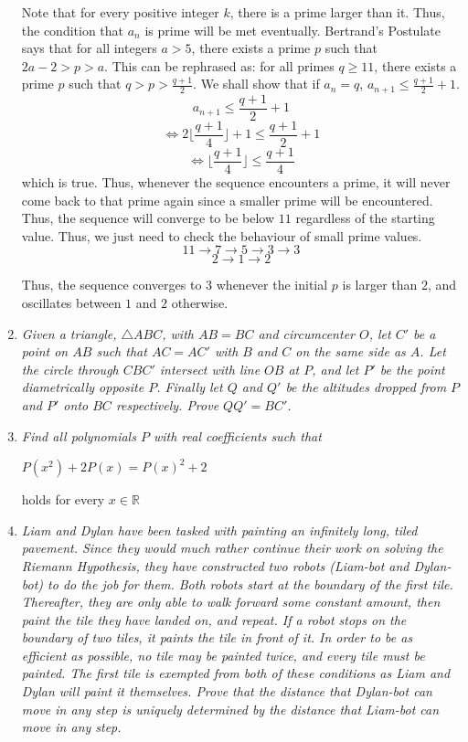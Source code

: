 \documentclass{article}
\begin{document}
\begin{enumerate}
Note that for every positive integer $k$, there is a prime larger than it. Thus, the condition that $a_n$ is prime will be met eventually. Bertrand's Postulate says that for all integers $a > 5$, there exists a prime $p$ such that $2a - 2 > p > a$. This can be rephrased as: for all primes $q \ge 11$, there exists a prime $p$ such that $q > p > \frac{q + 1}{2}$. We shall show that if $a_n = q$, $a_{n + 1} \le \frac{q + 1}{2} + 1$.
$$a_{n + 1} \le \frac{q + 1}{2} + 1$$
$$\iff 2\lfloor \frac{q + 1}{4}\rfloor + 1 \le \frac{q + 1}{2} + 1$$
$$\iff \lfloor \frac{q + 1}{4} \rfloor \le \frac{q + 1}{4}$$
which is true. Thus, whenever the sequence encounters a prime, it will never come back to that prime again since a smaller prime will be encountered. Thus, the sequence will converge to be below $11$ regardless of the starting value. Thus, we just need to check the behaviour of small prime values.
$$11 \rightarrow 7 \rightarrow 5 \rightarrow 3 \rightarrow 3$$
$$2 \rightarrow 1 \rightarrow 2$$

Thus, the sequence converges to $3$ whenever the initial $p$ is larger than $2$, and oscillates between $1$ and $2$ otherwise.

\medskip
\item %
{\itshape Given a triangle, $\triangle ABC$, with $AB = BC$ and circumcenter $O$, let $C'$ be a point on $AB$ such that $AC = AC'$ with $B$ and $C$ on the same side as $A$. Let the circle through $CBC'$ intersect with line $OB$ at $P$, and let $P'$ be the point diametrically opposite $P$. Finally let $Q$ and $Q'$ be the altitudes dropped from $P$ and $P'$ onto $BC$ respectively. Prove $QQ' = BC'$.
}


\medskip
\item %
{\itshape Find all polynomials $P$ with real coefficients such that
\begin{center}
    $P(x^2) + 2P(x) = {P(x)}^2 + 2$
\end{center}
holds for every $x\in\mathbb{R}$
}


\medskip
\item %
{\itshape Liam and Dylan have been tasked with painting an infinitely long, tiled pavement. Since they would much rather continue their work on solving the Riemann Hypothesis, they have constructed two robots (Liam-bot and Dylan-bot) to do the job for them. Both robots start at the boundary of the first tile. Thereafter, they are only able to walk forward some constant amount, then paint the tile they have landed on, and repeat. If a robot stops on the boundary of two tiles, it paints the tile in front of it. In order to be as efficient as possible, no tile may be painted twice, and every tile must be painted. The first tile is exempted from both of these conditions as Liam and Dylan will paint it themselves. Prove that the distance that Dylan-bot can move in any step is uniquely determined by the distance that Liam-bot can move in any step.
}


\end{enumerate}
\end{document}
